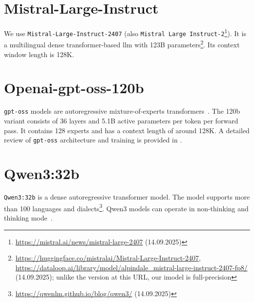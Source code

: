\section{Mistral-Large-Instruct}

We use \texttt{Mistral-Large-Instruct-2407} (also \texttt{Mistral Large Instruct-2}\footnote{\url{https://mistral.ai/news/mistral-large-2407} (14.09.2025)}).
It is a multilingual dense transformer-based \ac{llm} with 123B parameters\footnote{\url{https://huggingface.co/mistralai/Mistral-Large-Instruct-2407}, \url{https://dataloop.ai/library/model/alpindale_mistral-large-instruct-2407-fp8/}
(14.09.2025); unlike the version at this URL, our imodel is full-precision}.
Its context window length is 128K.

\section{Openai-gpt-oss-120b}

\texttt{gpt-oss} models are autoregressive mixture-of-experts transformers~\citep{openai2025gptoss120bgptoss20bmodel}.
The 120b variant consists of 36 layers and 5.1B active parameters per token per forward pass.
It contains 128 experts and has a context length of around 128K.
A detailed review of \texttt{gpt-oss} architecture and training is provided in \citep{openai2025gptoss120bgptoss20bmodel}.


\section{Qwen3:32b}
\texttt{Qwen3:32b} is a dense autoregressive transformer model.
The model supports more than 100 languages and dialects\footnote{\url{https://qwenlm.github.io/blog/qwen3/} (14.09.2025)}.
Qwen3 models can operate in non-thinking and thinking mode~\citep{qwen3_technical_report}.
